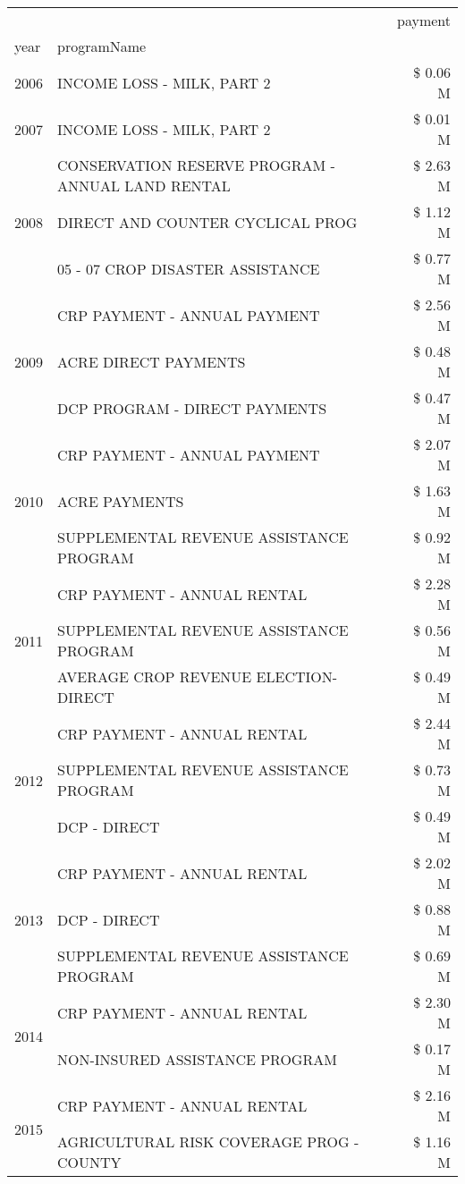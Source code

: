 \begin{tabular}{llr}
\toprule
 &  & payment \\
year & programName &  \\
\midrule
2006 & INCOME LOSS - MILK, PART 2 & \$ 0.06 M \\
\cline{1-3}
2007 & INCOME LOSS - MILK, PART 2 & \$ 0.01 M \\
\cline{1-3}
\multirow[t]{3}{*}{2008} & CONSERVATION RESERVE PROGRAM - ANNUAL LAND RENTAL & \$ 2.63 M \\
 & DIRECT AND COUNTER CYCLICAL PROG & \$ 1.12 M \\
 & 05 - 07 CROP DISASTER ASSISTANCE & \$ 0.77 M \\
\cline{1-3}
\multirow[t]{3}{*}{2009} & CRP PAYMENT - ANNUAL PAYMENT & \$ 2.56 M \\
 & ACRE DIRECT PAYMENTS & \$ 0.48 M \\
 & DCP PROGRAM - DIRECT PAYMENTS & \$ 0.47 M \\
\cline{1-3}
\multirow[t]{3}{*}{2010} & CRP PAYMENT - ANNUAL PAYMENT & \$ 2.07 M \\
 & ACRE PAYMENTS & \$ 1.63 M \\
 & SUPPLEMENTAL REVENUE ASSISTANCE PROGRAM & \$ 0.92 M \\
\cline{1-3}
\multirow[t]{3}{*}{2011} & CRP PAYMENT - ANNUAL RENTAL & \$ 2.28 M \\
 & SUPPLEMENTAL REVENUE ASSISTANCE PROGRAM & \$ 0.56 M \\
 & AVERAGE CROP REVENUE ELECTION-DIRECT & \$ 0.49 M \\
\cline{1-3}
\multirow[t]{3}{*}{2012} & CRP PAYMENT - ANNUAL RENTAL & \$ 2.44 M \\
 & SUPPLEMENTAL REVENUE ASSISTANCE PROGRAM & \$ 0.73 M \\
 & DCP - DIRECT & \$ 0.49 M \\
\cline{1-3}
\multirow[t]{3}{*}{2013} & CRP PAYMENT - ANNUAL RENTAL & \$ 2.02 M \\
 & DCP - DIRECT & \$ 0.88 M \\
 & SUPPLEMENTAL REVENUE ASSISTANCE PROGRAM & \$ 0.69 M \\
\cline{1-3}
\multirow[t]{2}{*}{2014} & CRP PAYMENT - ANNUAL RENTAL & \$ 2.30 M \\
 & NON-INSURED ASSISTANCE PROGRAM & \$ 0.17 M \\
\cline{1-3}
\multirow[t]{3}{*}{2015} & CRP PAYMENT - ANNUAL RENTAL & \$ 2.16 M \\
 & AGRICULTURAL RISK COVERAGE PROG - COUNTY & \$ 1.16 M \\

\end{tabular}
